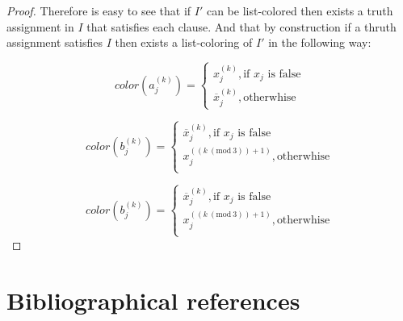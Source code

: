 \documentclass[9pt]{../document-types/entcs} \usepackage{../document-types/entcsmacro}
\newcommand{\Mod}[1]{\ (\mathrm{mod}\ #1)}
\begin{document}
\begin{proof}
    Therefore is easy to see that if $I'$ can be list-colored then exists a truth assignment in $I$ that satisfies each clause. And that by construction if a thruth assignment satisfies $I$ then exists a list-coloring of $I'$ in the following way:

    \[color(a_j^{(k)})=
    \begin{cases}
       x_j^{(k)}, \text{if $x_j$ is false}\\
       \overline{x}_j^{(k)}, \text{otherwhise}
    \end{cases}
    \]

    \[color(b_j^{(k)})=
    \begin{cases}
      \overline{x}_j^{(k)}, \text{if $x_j$ is false} \\
       x_j^{((k \Mod{3}) + 1 )}, \text{otherwhise} \\
    \end{cases}
    \]

    \[color(b_j^{(k)})=
    \begin{cases}
      \overline{x}_j^{(k)}, \text{if $x_j$ is false} \\
       x_j^{((k \Mod{3}) + 1 )}, \text{otherwhise} \\
    \end{cases}
    \]

\end{proof}




\section{Bibliographical references}\label{references}

\begin{thebibliography}{10}\label{bibliography}

\end{thebibliography}
\end{document}
